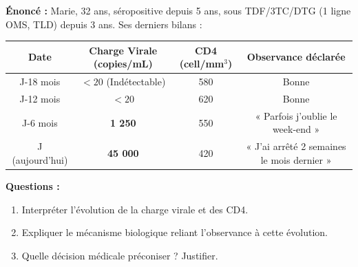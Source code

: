 \documentclass[11pt]{article}
\begin{document}
\begin{exoresolu}
\textbf{Énoncé :} Marie, 32 ans, séropositive depuis 5 ans, sous TDF/3TC/DTG (1 ligne OMS, TLD) depuis 3 ans. Ses derniers bilans :
\begin{center}
\begin{tabular}{|c|c|c|c|}\hline
\textbf{Date} & \textbf{Charge Virale (copies/mL)} & \textbf{CD4 (cell/mm$^3$)} & \textbf{Observance déclarée} \\ \hline
J-18 mois & $< 20$ (Indétectable) & 580 & Bonne \\ \hline
J-12 mois & $< 20$ & 620 & Bonne \\ \hline
J-6 mois & \textbf{1 250} & 550 & « Parfois j'oublie le week-end » \\ \hline
J (aujourd'hui) & \textbf{45 000} & 420 & « J'ai arrêté 2 semaines le mois dernier » \\ \hline
\end{tabular}
\end{center}
\textbf{Questions :}
\begin{enumerate}
    \item Interpréter l'évolution de la charge virale et des CD4.
    \item Expliquer le mécanisme biologique reliant l'observance à cette évolution.
    \item Quelle décision médicale préconiser ? Justifier.
\end{enumerate}


\end{exoresolu}
\end{document}
